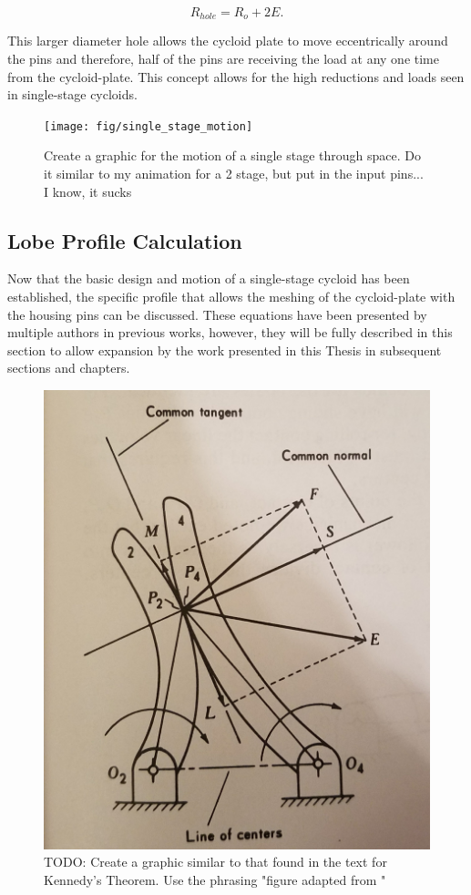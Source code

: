 \begin{equation} \label{eq:pin_hole_diam}
R_{hole} = R_o + 2E.
\end{equation}

This larger diameter hole allows the cycloid plate to move eccentrically around the pins and therefore, half of the pins are receiving the load at any one time from the cycloid-plate. This concept allows for the high reductions and loads seen in single-stage cycloids.

\begin{figure}[h]
   \centering
   \texttt{[image: fig/single\_stage\_motion]}
   \caption{Create a graphic for the motion of a single stage through space. Do it similar to my animation for a 2 stage, but put in the input pins... I know, it sucks}
   \label{fig:singe_motion}
\end{figure}

\subsection{Lobe Profile Calculation} \label{ch:design:basic_calc:profile}

Now that the basic design and motion of a single-stage cycloid has been established, the specific profile that allows the meshing of the cycloid-plate with the housing pins can be discussed. These equations have been presented by multiple authors in previous works, however, they will be fully described in this section to allow expansion by the work presented in this Thesis in subsequent sections and chapters. 

\begin{figure}[h]
   \centering
   \includegraphics[width=0.60\linewidth]{fig/kennedy_sliding_TODO}
   \caption{TODO: Create a graphic similar to that found in the text for Kennedy's Theorem. Use the phrasing "figure adapted from \cite{ref:kinematics_and_dynamics}"}
   \label{fig:kennedy_sliding}
\end{figure}

